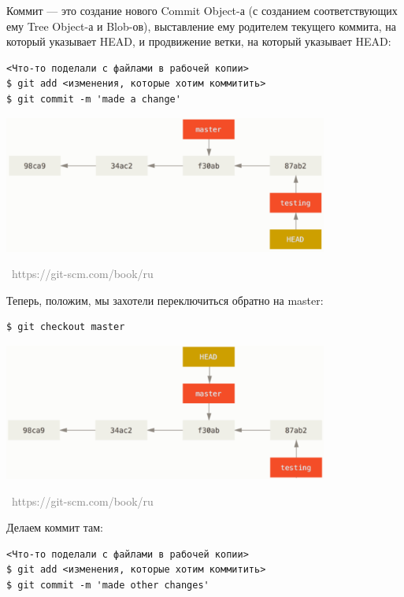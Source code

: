 \documentclass[a5paper]{article}
\newcommand{\attribution}[1] {
\vspace{-5mm}\begin{flushright}\begin{scriptsize}\textcolor{gray}{\textcopyright\, #1}\end{scriptsize}\end{flushright}
}
\begin{document}
Коммит --- это создание нового Commit Object-а (с созданием соответствующих ему Tree Object-а и Blob-ов), выставление ему родителем текущего коммита, на который указывает HEAD, и продвижение ветки, на который указывает HEAD:

\begin{verbatim}
<Что-то поделали с файлами в рабочей копии>
$ git add <изменения, которые хотим коммитить>
$ git commit -m 'made a change'
\end{verbatim}

\begin{center}
	\includegraphics[width=0.8\textwidth]{newCommit.png}
	\attribution{https://git-scm.com/book/ru}
\end{center}

Теперь, положим, мы захотели переключиться обратно на master:

\begin{verbatim}
$ git checkout master
\end{verbatim}

\begin{center}
	\includegraphics[width=0.8\textwidth]{checkoutToMaster.png}
	\attribution{https://git-scm.com/book/ru}
\end{center}

Делаем коммит там:

\begin{verbatim}
<Что-то поделали с файлами в рабочей копии>
$ git add <изменения, которые хотим коммитить>
$ git commit -m 'made other changes'
\end{verbatim}
\end{document}
